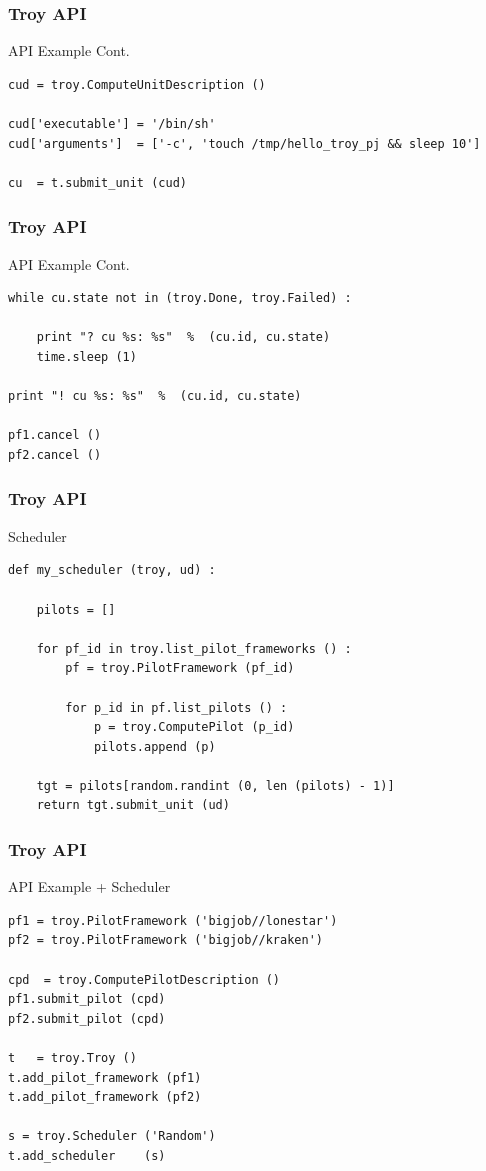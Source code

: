 \documentclass{beamer}
\begin{document}
\begin{frame}[fragile] 
 \frametitle{Troy API}
 {\footnotesize
  \begin{block}{API Example Cont.}
\begin{verbatim}
cud = troy.ComputeUnitDescription ()

cud['executable'] = '/bin/sh'
cud['arguments']  = ['-c', 'touch /tmp/hello_troy_pj && sleep 10']

cu  = t.submit_unit (cud)
\end{verbatim}
  \end{block}
 }
\end{frame}

\begin{frame}[fragile] 
 \frametitle{Troy API}
 {\footnotesize
  \begin{block}{API Example Cont.}
\begin{verbatim}
while cu.state not in (troy.Done, troy.Failed) :

    print "? cu %s: %s"  %  (cu.id, cu.state)
    time.sleep (1)

print "! cu %s: %s"  %  (cu.id, cu.state)

pf1.cancel ()
pf2.cancel ()
\end{verbatim}
  \end{block}
 }
\end{frame}

\begin{frame}[fragile] 
 \frametitle{Troy API}
 {\footnotesize
  \begin{block}{Scheduler}
\begin{verbatim}
def my_scheduler (troy, ud) :

    pilots = []

    for pf_id in troy.list_pilot_frameworks () :
        pf = troy.PilotFramework (pf_id)

        for p_id in pf.list_pilots () :
            p = troy.ComputePilot (p_id)
            pilots.append (p)

    tgt = pilots[random.randint (0, len (pilots) - 1)]
    return tgt.submit_unit (ud)
\end{verbatim}
  \end{block}
 }
\end{frame}


\begin{frame}[fragile] 
 \frametitle{Troy API}
 {\footnotesize
  \begin{block}{API Example + Scheduler}
   \begin{verbatim}
pf1 = troy.PilotFramework ('bigjob//lonestar')
pf2 = troy.PilotFramework ('bigjob//kraken')

cpd  = troy.ComputePilotDescription ()
pf1.submit_pilot (cpd)
pf2.submit_pilot (cpd)

t   = troy.Troy ()
t.add_pilot_framework (pf1)
t.add_pilot_framework (pf2)

s = troy.Scheduler ('Random')
t.add_scheduler    (s)
   \end{verbatim}
  \end{block}
 }
\end{frame}
\end{document}
